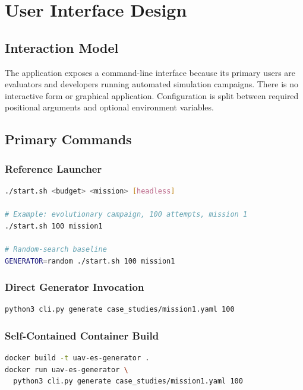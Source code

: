 \documentclass[11pt,a4paper,openany]{report}
\begin{document}
\chapter{User Interface Design}

\section{Interaction Model}
The application exposes a command-line interface because its primary users are evaluators and developers running automated simulation campaigns. There is no interactive form or graphical application. Configuration is split between required positional arguments and optional environment variables.

\section{Primary Commands}
\subsection{Reference Launcher}
\begin{lstlisting}[language=bash]
./start.sh <budget> <mission> [headless]

# Example: evolutionary campaign, 100 attempts, mission 1
./start.sh 100 mission1

# Random-search baseline
GENERATOR=random ./start.sh 100 mission1
\end{lstlisting}

\subsection{Direct Generator Invocation}
\begin{lstlisting}[language=bash]
python3 cli.py generate case_studies/mission1.yaml 100
\end{lstlisting}

\subsection{Self-Contained Container Build}
\begin{lstlisting}[language=bash]
docker build -t uav-es-generator .
docker run uav-es-generator \
  python3 cli.py generate case_studies/mission1.yaml 100
\end{lstlisting}
\end{document}
